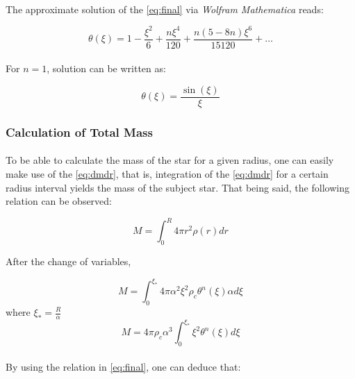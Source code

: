 \documentclass[letterpaper,12pt]{article}
\begin{document}
\paragraph{} The approximate solution of the \eqref{eq:final} via \textit{Wolfram Mathematica} reads:

\begin{equation*}  
      \theta(\xi) =  1-\frac{\xi ^2}{6}+\frac{n \xi ^4}{120}+\frac{n (5-8 n) \xi ^6}{15120}+\dots
\end{equation*}

\paragraph{} For $n = 1$, solution can be written as:

\begin{equation*}
    \theta(\xi) =  \frac{\sin (\xi )}{\xi }
\end{equation*}

\subsubsection{Calculation of Total Mass}

\paragraph{} To be able to calculate the mass of the star for a given radius, one can easily make use of the \eqref{eq:dmdr}, that is, integration of the \eqref{eq:dmdr} for a certain radius interval yields the mass of the subject star. That being said, the following relation can be observed:

\begin{equation*}
   M =  \int_0^R {4\pi r^2 \rho(r)}dr
\end{equation*}

After the change of variables,

\begin{equation*}
    M = \int_0^{\xi_*} {4 \pi \alpha^2 \xi^2 \rho_c \theta^n (\xi)} \alpha d\xi
\end{equation*}
where ${\xi_*} = \frac{R}{\alpha}$
\begin{equation*}
    M =4 \pi \rho_c \alpha^3 \int_0^{\xi_*} {\xi^2 \theta^n (\xi)} d\xi
\end{equation*}

\paragraph{} By using the relation in \eqref{eq:final}, one can deduce that:
\end{document}
